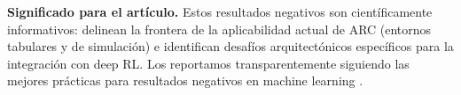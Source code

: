 \documentclass{article}
\begin{document}
\textbf{Significado para el artículo.} Estos resultados negativos son científicamente informativos: delinean la frontera de la aplicabilidad actual de ARC (entornos tabulares y de simulación) e identifican desafíos arquitectónicos específicos para la integración con deep RL. Los reportamos transparentemente siguiendo las mejores prácticas para resultados negativos en machine learning \cite{Garcia2015}.
\end{document}
